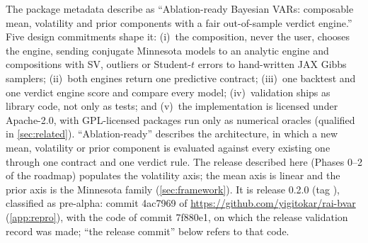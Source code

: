 The package metadata describe  as ``Ablation-ready Bayesian VARs: composable mean, volatility and prior components with a fair out-of-sample verdict engine.'' %
Five design commitments shape it:
(i)~the composition, never the user, chooses the engine, sending conjugate Minnesota models to an analytic engine and compositions with SV, outliers or Student-$t$ errors to hand-written JAX Gibbs samplers;
(ii)~both engines return one predictive contract;
(iii)~one backtest and one verdict engine score and compare every model;
(iv)~validation ships as library code, not only as tests;
and (v)~the implementation is licensed under Apache-2.0, with GPL-licensed packages run only as numerical oracles (qualified in \cref{sec:related}). %
``Ablation-ready'' describes the architecture, in which a new mean, volatility or prior component is evaluated against every existing one through one contract and one verdict rule.
The release described here (Phases 0--2 of the roadmap) populates the volatility axis; the mean axis is linear and the prior axis is the Minnesota family (\cref{sec:framework}). %
It is release 0.2.0 (tag ), classified as pre-alpha: commit 4ac7969 of \url{https://github.com/yigitokar/rai-bvar} (\cref{app:repro}), with the code of commit 7f880e1, on which the release validation record was made; ``the release commit'' below refers to that code. %

